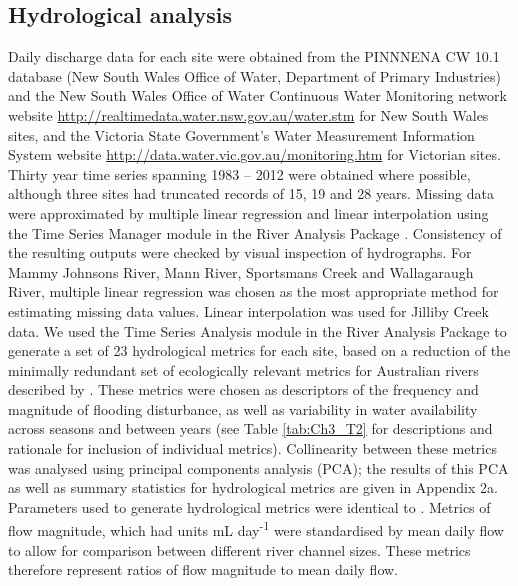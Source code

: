 \documentclass[12pt,a4paper]{memoir}
\begin{document}
\subsection{Hydrological analysis}
Daily discharge data for each site were obtained from the PINNNENA CW 10.1 database (New South Wales Office of Water, Department of Primary Industries) and the New South Wales Office of Water Continuous Water Monitoring network website \url{http://realtimedata.water.nsw.gov.au/water.stm} for New South Wales sites, and the Victoria State Government’s Water Measurement Information System website \url{http://data.water.vic.gov.au/monitoring.htm} for Victorian sites.  Thirty year time series spanning 1983 – 2012 were obtained where possible, although three sites had truncated records of 15, 19 and 28 years. Missing data were approximated by multiple linear regression  and linear interpolation using the Time Series Manager module in the River Analysis Package \citep{marsh2003river}. Consistency of the resulting outputs were checked by visual
inspection of hydrographs. For Mammy Johnsons River, Mann River, Sportsmans Creek and Wallagaraugh River, multiple linear regression was chosen as the most
appropriate method for estimating missing data values. Linear interpolation was used for Jilliby Creek data.  We used the Time Series Analysis module in the River Analysis Package to generate a set of 23 hydrological metrics for each site, based on a reduction of the minimally redundant set of ecologically relevant metrics for Australian rivers described by \citet{Kennard2010}. These metrics were chosen as descriptors of the frequency and magnitude of flooding disturbance, as well as variability in water availability across seasons and between years (see Table \ref{tab:Ch3_T2} for descriptions and rationale for inclusion of individual metrics). Collinearity between these metrics was analysed using principal components analysis (PCA); the results of this PCA as well as summary statistics for hydrological metrics are given in Appendix 2a. Parameters used to generate hydrological metrics were identical to \citet{Lawson2015}. Metrics of flow magnitude, which had units mL day\textsuperscript{-1} were standardised by mean daily flow to allow for comparison between different river channel sizes. These metrics therefore represent ratios of flow magnitude to mean daily flow.
\end{document}
